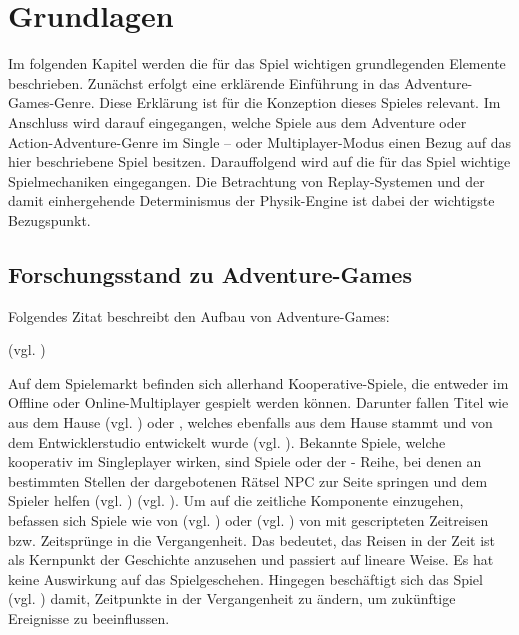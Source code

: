 \chapter{Grundlagen}\label{sec:basics}
Im folgenden Kapitel werden die für das Spiel wichtigen grundlegenden Elemente beschrieben. Zunächst erfolgt eine erklärende Einführung in das Adventure-Games-Genre. Diese Erklärung ist für die Konzeption dieses Spieles relevant. Im Anschluss wird darauf eingegangen, welche Spiele aus dem Adventure oder Action-Adventure-Genre im Single – oder Multiplayer-Modus einen Bezug auf das hier beschriebene Spiel besitzen. Darauffolgend wird auf die für das Spiel wichtige Spielmechaniken eingegangen. Die Betrachtung von Replay-Systemen und der damit einhergehende Determinismus der Physik-Engine ist dabei der wichtigste Bezugspunkt.
\section{Forschungsstand zu Adventure-Games}
Folgendes Zitat beschreibt den Aufbau von Adventure-Games:

 (vgl. \cite{noauthor_what_2012})

Auf dem Spielemarkt befinden sich allerhand Kooperative-Spiele, die entweder im Offline oder Online-Multiplayer gespielt werden können. Darunter fallen Titel wie  aus dem Hause  (vgl. \cite{arts_way_2017}) oder , welches ebenfalls aus dem Hause  stammt und von dem Entwicklerstudio  entwickelt wurde (vgl. \cite{arts_entdecke_2022}). Bekannte Spiele, welche kooperativ im Singleplayer wirken, sind Spiele  oder der - Reihe, bei denen an bestimmten Stellen der dargebotenen Rätsel NPC zur Seite springen und dem Spieler helfen (vgl. \cite{noauthor_last_tlou}) (vgl. \cite{noauthor_uncharted_nodate}). Um auf die zeitliche Komponente einzugehen, befassen sich Spiele wie  von  (vgl. \cite{noauthor_kaufen_nodate}) oder  (vgl. \cite{noauthor_bioshock_nodate}) von  mit gescripteten Zeitreisen bzw. Zeitsprünge in die Vergangenheit. Das bedeutet, das Reisen in der Zeit ist als Kernpunkt der Geschichte anzusehen und passiert auf lineare Weise. Es hat keine Auswirkung auf das Spielgeschehen. Hingegen beschäftigt sich das Spiel  (vgl. \cite{noauthor_life_nodate}) damit, Zeitpunkte in der Vergangenheit zu ändern, um zukünftige Ereignisse zu beeinflussen.

